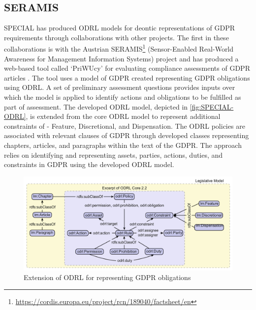 \subsection*{SERAMIS}
SPECIAL has produced ODRL models for deontic representations of GDPR requirements through collaborations with other projects. The first in these collaborations is with the Austrian SERAMIS\footnote{\url{https://cordis.europa.eu/project/rcn/189040/factsheet/en}} (Sensor-Enabled Real-World Awareness for Management Information Systems) project and has produced a web-based tool called `PriWUcy' for evaluating compliance assessments of GDPR articles \cite{agarwal_d5.5_2017,agarwal_legislative_2018}.
The tool uses a model of GDPR created representing GDPR obligations using ODRL. A set of preliminary assessment questions provides inputs over which the model is applied to identify actions and obligations to be fulfilled as part of assessment. The developed ODRL model, depicted in \autoref{fig:SPECIAL-ODRL}, is extended from the core ODRL model to represent additional constraints of - Feature, Discretional, and Dispensation. The ODRL policies are associated with relevant clauses of GDPR through developed classes representing chapters, articles, and paragraphs within the text of the GDPR. The approach relies on identifying and representing assets, parties, actions, duties, and constraints in GDPR using the developed ODRL model.
\begin{figure}[htbp]
    \centering
    \includegraphics[width=\linewidth]{img/SPECIAL_ODRL.png}
    \caption{Extension of ODRL for representing GDPR obligations \cite{agarwal_legislative_2018}}
    \label{fig:SPECIAL-ODRL}
\end{figure}

